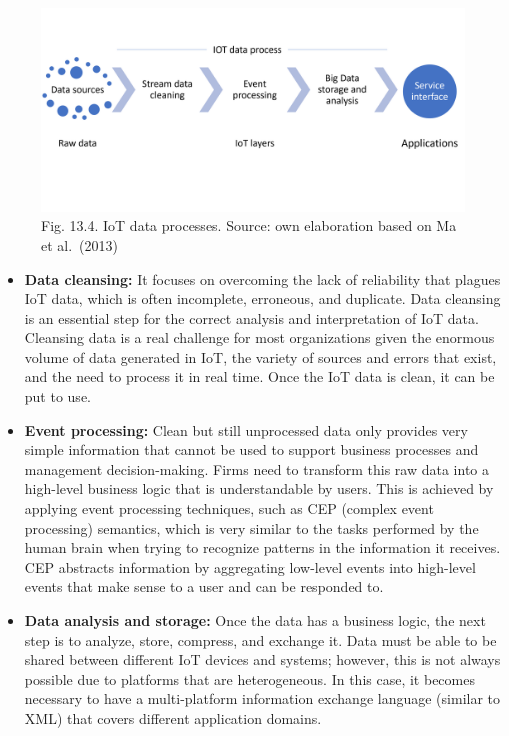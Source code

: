 \documentclass[
  letterpaper,
  DIV=11,
  numbers=noendperiod]{scrreprt}
\begin{document}
\begin{figure}

{\centering \includegraphics{img/fig19.png}

}

\caption{Fig. 13.4. IoT data processes. Source: own elaboration based on
Ma et al.~(2013)}

\end{figure}

\begin{itemize}
\item
  \textbf{Data cleansing:} It focuses on overcoming the lack of
  reliability that plagues IoT data, which is often incomplete,
  erroneous, and duplicate. Data cleansing is an essential step for the
  correct analysis and interpretation of IoT data. Cleansing data is a
  real challenge for most organizations given the enormous volume of
  data generated in IoT, the variety of sources and errors that exist,
  and the need to process it in real time. Once the IoT data is clean,
  it can be put to use.
\item
  \textbf{Event processing:} Clean but still unprocessed data only
  provides very simple information that cannot be used to support
  business processes and management decision-making. Firms need to
  transform this raw data into a high-level business logic that is
  understandable by users. This is achieved by applying event processing
  techniques, such as CEP (complex event processing) semantics, which is
  very similar to the tasks performed by the human brain when trying to
  recognize patterns in the information it receives. CEP abstracts
  information by aggregating low-level events into high-level events
  that make sense to a user and can be responded to.
\item
  \textbf{Data analysis and storage:} Once the data has a business
  logic, the next step is to analyze, store, compress, and exchange it.
  Data must be able to be shared between different IoT devices and
  systems; however, this is not always possible due to platforms that
  are heterogeneous. In this case, it becomes necessary to have a
  multi-platform information exchange language (similar to XML) that
  covers different application domains.
\end{itemize}
\end{document}

